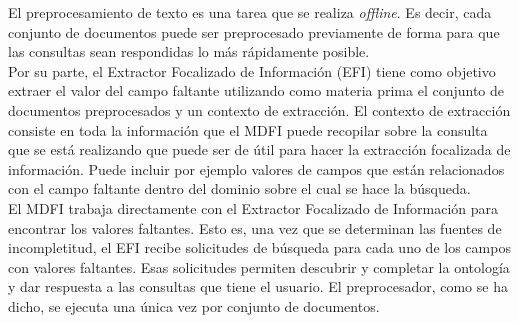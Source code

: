 El preprocesamiento de texto es una tarea que se realiza \emph{offline}. Es decir, cada conjunto de documentos puede ser preprocesado previamente de forma para que las consultas sean respondidas lo más rápidamente posible. \\

Por su parte, el Extractor Focalizado de Información (EFI) tiene como objetivo extraer el valor del campo faltante utilizando como materia prima el conjunto de documentos preprocesados y un contexto de extracción. El contexto de extracción consiste en toda la información que el MDFI puede recopilar sobre la consulta que se está realizando que puede ser de útil para hacer la extracción focalizada de información. Puede incluir por ejemplo valores de campos que están relacionados con el campo faltante dentro del dominio sobre el cual se hace la búsqueda.  \\

El MDFI trabaja directamente con el Extractor Focalizado de Información para encontrar los valores faltantes. Esto es, una vez que se determinan las fuentes de incompletitud, el EFI recibe solicitudes de búsqueda para cada uno de los campos con valores faltantes. Esas solicitudes permiten descubrir y completar la ontología y dar respuesta a las consultas que tiene el usuario. El preprocesador, como se ha dicho, se ejecuta una única vez por conjunto de documentos. \\

